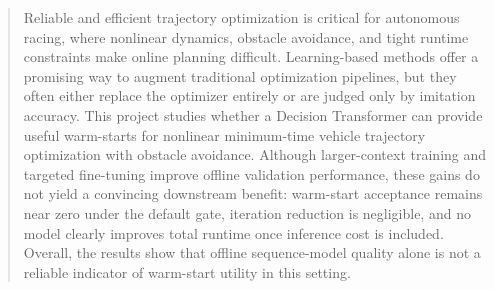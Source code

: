 \begin{abstract}
Reliable and efficient trajectory optimization is critical for autonomous racing, where nonlinear dynamics, obstacle avoidance, and tight runtime constraints make online planning difficult. Learning-based methods offer a promising way to augment traditional optimization pipelines, but they often either replace the optimizer entirely or are judged only by imitation accuracy. This project studies whether a Decision Transformer can provide useful warm-starts for nonlinear minimum-time vehicle trajectory optimization with obstacle avoidance. Although larger-context training and targeted fine-tuning improve offline validation performance, these gains do not yield a convincing downstream benefit: warm-start acceptance remains near zero under the default gate, iteration reduction is negligible, and no model clearly improves total runtime once inference cost is included. Overall, the results show that offline sequence-model quality alone is not a reliable indicator of warm-start utility in this setting.
\end{abstract}